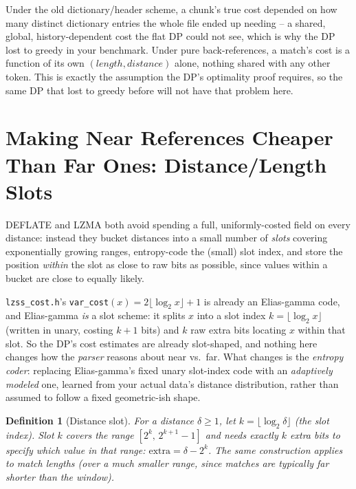 \documentclass[11pt]{article}
\newtheorem{definition}{Definition}
\begin{document}
\begin{tcolorbox}[colback=blue!5!white,colframe=blue!50!black,title=Reminder: why this is exactly the right unit now]
Under the old dictionary/header scheme, a chunk's true cost depended on how many
distinct dictionary entries the whole file ended up needing -- a shared, global,
history-dependent cost the flat DP could not see, which is why the DP lost to greedy in
your benchmark. Under pure back-references, a match's cost is a function of its own
$(length, distance)$ alone, nothing shared with any other token. This is exactly the
assumption the DP's optimality proof requires, so the same DP that lost to greedy
before will not have that problem here.
\end{tcolorbox}

\section{Making Near References Cheaper Than Far Ones: Distance/Length Slots}
\label{sec:slots}

DEFLATE and LZMA both avoid spending a full, uniformly-costed field on every distance:
instead they bucket distances into a small number of \emph{slots} covering
exponentially growing ranges, entropy-code the (small) slot index, and store the
position \emph{within} the slot as close to raw bits as possible, since values within a
bucket are close to equally likely.

\begin{tcolorbox}[colback=blue!5!white,colframe=blue!50!black,title=You already have a version of this -- here's the connection]
\texttt{lzss\_cost.h}'s \texttt{var\_cost}$(x) = 2\lfloor\log_2 x\rfloor + 1$ is already
an Elias-gamma code, and Elias-gamma \emph{is} a slot scheme: it splits $x$ into a slot
index $k = \lfloor \log_2 x \rfloor$ (written in unary, costing $k{+}1$ bits) and $k$
raw extra bits locating $x$ within that slot. So the DP's cost estimates are already
slot-shaped, and nothing here changes how the \emph{parser} reasons about near vs.\ far.
What changes is the \emph{entropy coder}: replacing Elias-gamma's fixed unary slot-index
code with an \emph{adaptively modeled} one, learned from your actual data's distance
distribution, rather than assumed to follow a fixed geometric-ish shape.
\end{tcolorbox}

\begin{definition}[Distance slot]
For a distance $\delta \ge 1$, let $k = \lfloor \log_2 \delta \rfloor$ (the slot index).
Slot $k$ covers the range $[2^k,\, 2^{k+1}-1]$ and needs exactly $k$ extra bits to
specify \emph{which} value in that range: $\text{extra} = \delta - 2^k$. The same
construction applies to match lengths (over a much smaller range, since matches are
typically far shorter than the window).
\end{definition}
\end{document}
